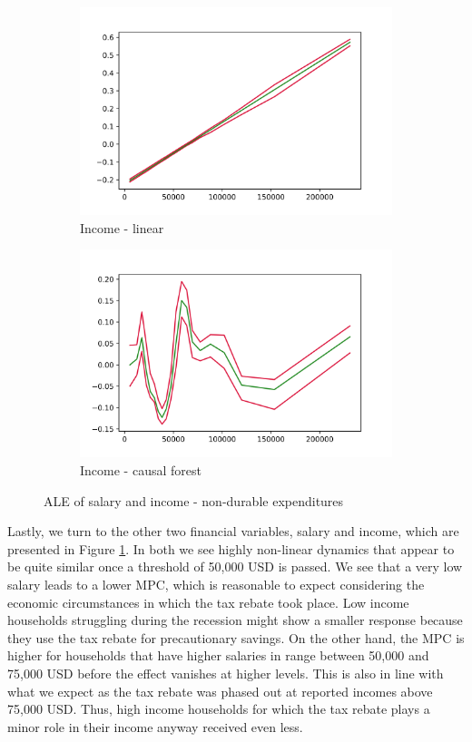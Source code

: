 \begin{figure}[t]
    \begin{subfigure}{0.5\textwidth}
        \includegraphics[width=\textwidth]{figures/ALE/chNDexp/spec3_linear_FINCBTXM.png}
        \caption{Income - linear}
    \end{subfigure}\hfill
    \begin{subfigure}{0.5\textwidth}
        \includegraphics[width=\textwidth]{figures/ALE/chNDexp/spec3_cf_FINCBTXM.png}
        \caption{Income - causal forest}
    \end{subfigure}\hfill
    \caption{ALE of salary and income - non-durable expenditures}
    \label{fig:ale_saleinc}
\end{figure}
Lastly, we turn to the other two financial variables, salary and income, which are presented in Figure \ref{fig:ale_saleinc}. In both we see highly non-linear dynamics that appear to be quite similar once a threshold of 50,000 USD is passed. We see that a very low salary leads to a lower MPC, which is reasonable to expect considering the economic circumstances in which the tax rebate took place. Low income households struggling during the recession might show a smaller response because they use the tax rebate for precautionary savings. On the other hand, the MPC is higher for households that have higher salaries in range between 50,000 and 75,000 USD before the effect vanishes at higher levels. This is also in line with what we expect as the tax rebate was phased out at reported incomes above 75,000 USD. Thus, high income households for which the tax rebate plays a minor role in their income anyway received even less. 